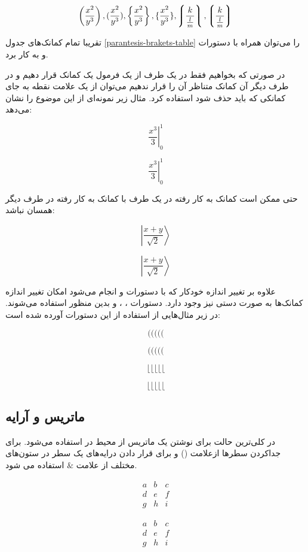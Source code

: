 \[
 \left( \frac{x^2}{y^3} \right) , ( \frac{x^2}{y^3} ) ,
 \left\{ \frac{x^2}{y^3} \right\} , \{ \frac{x^2}{y^3} \} ,
 \left \lmoustache \frac{k}{\frac{l}{m}} \right \rmoustache ,
 \left \lgroup \frac{k}{\frac{l}{m}} \right \rgroup  
\]

تقریبا تمام کمانک‌های جدول \ref{parantesis-brakets-table} را می‌توان همراه با
دستورات  و  به کار برد.

در صورتی که بخواهیم فقط در یک طرف از یک فرمول یک کمانک قرار دهیم و در طرف دیگر
آن کمانک متناظر آن را قرار ندهیم می‌توان از یک علامت نقطه به جای کمانکی که باید
حذف شود استفاده کرد. مثال زیر نمونه‌ای از این موضوع را نشان می‌دهد:
\begin{latex}
\[
 \left.\frac{x^3}{3}\right|_0^1
\]
\end{latex}

\[
 \left. \frac{x^3}{3} \right|_0^1
\]

حتی ممکن است کمانک به کار رفته در یک طرف با کمانک به کار رفته در طرف دیگر همسان
نباشد:

\begin{latex}
\[
 \left| \frac{x + y}{\sqrt{2}} \right \rangle
\]
\end{latex}

\[
 \left| \frac{x + y}{\sqrt{2}} \right \rangle
\]

علاوه بر تغییر اندازه خودکار که با دستورات  و
 انجام می‌شود امکان تغییر اندازه کمانک‌ها به صورت دستی
نیز وجود دارد. دستورات  ،  ،
 و  بدین منظور استفاده می‌شوند.
در زیر مثال‌هایی از استفاده از این دستورات آورده شده است:
\begin{latex}
\[
 ( \big( \Big( \bigg( \Bigg(
\]
\end{latex}
\[
 ( \big( \Big( \bigg( \Bigg(
\]
\begin{latex}
\[
 \lfloor \big\lfloor \Big\lfloor \bigg\lfloor \Bigg\lfloor
\]
\end{latex}
\[
 \lfloor \big\lfloor \Big\lfloor \bigg\lfloor \Bigg\lfloor
\]

\subsection{ماتریس و آرایه}
در کلی‌ترین حالت برای نوشتن یک ماتریس از محیط  در \lr{\LaTeX} استفاده
می‌شود. برای جداکردن سطرها ازعلامت (\lr{\textbackslash\textbackslash}) و برای
قرار دادن درایه‌های یک سطر در ستون‌های مختلف از علامت $\&$ استفاده می شود.
\begin{latex}
\[
 \begin{matrix}
  a & b & c \\
  d & e & f \\
  g & h & i
 \end{matrix}
\]
\end{latex}
\[
 \begin{matrix}
  a & b & c \\
  d & e & f \\
  g & h & i
 \end{matrix}
\]

